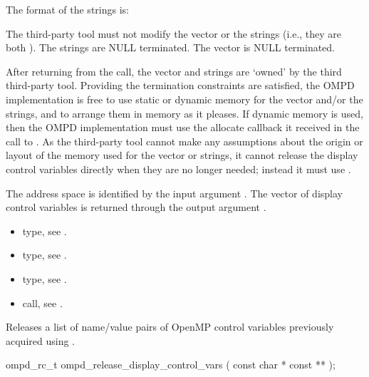 The format of the strings is:
\begin{center}
\end{center}

The third-party tool must not modify the vector or the strings
(i.e., they are both ).
The strings are NULL terminated.
The vector is NULL terminated.

After returning from the call, the vector and strings are `owned'
by the third third-party tool.
Providing the termination constraints are satisfied, the OMPD
implementation is free to use static or dynamic memory for the
vector and/or the strings, and to arrange them in memory
as it pleases.
If dynamic memory is used, then the OMPD implementation must use
the allocate callback it received in the call to .
As the third-party tool cannot make any assumptions about the origin or
layout of the memory used for the vector or strings, it cannot release
the display control variables directly when they are no longer
needed; instead it must use .

\argdesc
The address space is identified by the input argument .
The vector of display control variables is returned through
the output argument .

\crossreferences
\begin{itemize}
  \item {} type, see .
	\item {} type, see .
	\item {} type, see .
	\item {} call, see .
\end{itemize}


\label{subsubsubsec:ompd_release_display_control_vars}
\summary

Releases a list of name/value pairs of OpenMP control variables
previously acquired using .
\format
\begin{cspecific}
\begin{ompSyntax}
ompd_rc_t ompd_release_display_control_vars (
  const char * const **
);
\end{ompSyntax}
\end{cspecific}

